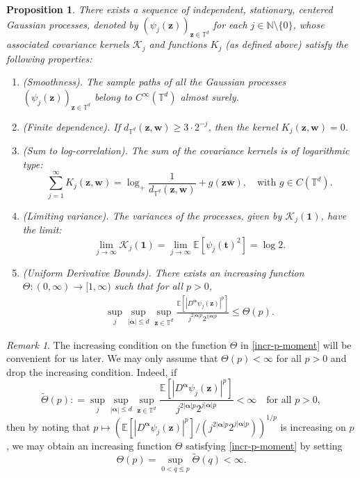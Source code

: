 \documentclass[12pt]{amsart}
\newtheorem{proposition}[theorem]{Proposition}
\theoremstyle{definition}
\theoremstyle{remark}
\newtheorem*{remark*}{Remark}
\newcommand{\bt}{\boldsymbol{t}}
\newcommand{\bz}{\boldsymbol{z}}
\newcommand{\bw}{\boldsymbol{w}}
\newcommand{\N}{\mathbb{N}}
\newcommand{\E}{\mathbb{E}}
\newcommand{\T}{\mathbb{T}}
\numberwithin{equation}{section}
\begin{document}
\begin{proposition}\label{prop:smooth-decomposition-log-correlated-field}
There exists a sequence of independent, stationary, centered Gaussian processes, denoted by $(\psi_j(\bz))_{\bz \in \T^d}$ for each $j\in \N\setminus\{0\}$, whose associated covariance kernels $\mathcal{K}_j$ and functions $K_j$ (as defined above) satisfy the following properties:
\begin{enumerate}
    \item[(P0)] (Smoothness). The sample paths of all the Gaussian processes $(\psi_j(\bz))_{\bz\in \T^d}$ belong to $C^\infty(\T^d)$ almost surely.

    \item[(P1)] (Finite dependence). If $d_{\T^d}(\bz, \bw) \ge 3 \cdot 2^{-j}$, then the kernel $K_j(\bz, \bw) = 0$.
    
    \item[(P2)] (Sum to log-correlation). The sum of the covariance kernels is of logarithmic type:
    \[
    \sum_{j=1}^{\infty} K_j(\bz, \bw) = \log_+ \frac{1}{d_{\T^d}(\bz, \bw)} + g(\bz\bar{\bw}),    \quad \text{with $g \in C(\T^d)$.}
    \]

    
    
    \item[(P3)] (Limiting variance).  The variances of the processes, given by $\mathcal{K}_j(\mathbf{1})$, have the limit:
    \[
    \lim_{j \to \infty} \mathcal{K}_j(\boldsymbol{1}) =\lim\limits_{j\to \infty}\mathbb{E}[\psi_j(\bt)^2]=\log 2.
    \]
    
    \item[(P4)] (Uniform Derivative Bounds). There exists an increasing function $\Theta: (0, \infty) \to [1, \infty)$ such that for all $p > 0$,
    \begin{align}\label{incr-p-moment}
        \sup_{j} \sup_{|\boldsymbol{\alpha}| \le d} \sup_{\bz\in \T^d} \frac{\E[|D^{\boldsymbol{\alpha}}\psi_j(\bz)|^p]}{j^{2|\boldsymbol{\alpha}|p}2^{j|\boldsymbol{\alpha}|p}} \le \Theta(p).
    \end{align}
\end{enumerate}
\end{proposition}

\begin{remark*}
The increasing condition on  the function $\Theta$ in \eqref{incr-p-moment} will be convenient for us later.   We may only assume that $\Theta(p)<\infty$ for all $p>0$  and drop the increasing  condition.  Indeed, if 
\[
\widetilde{\Theta}(p): = \sup_{j} \sup_{|\boldsymbol{\alpha}| \le d} \sup_{\bz\in \T^d} \frac{\E[|D^{\boldsymbol{\alpha}}\psi_j(\bz)|^p]}{j^{2|\boldsymbol{\alpha}|p}2^{j|\boldsymbol{\alpha}|p}} <\infty \quad \text{for all $p>0$},
\]
then by noting that 
$
p\mapsto (\E[|D^{\boldsymbol{\alpha}}\psi_j(\bz)|^p]/ (j^{2|\boldsymbol{\alpha}|p}2^{j|\boldsymbol{\alpha}|p}))^{1/p}
$ is increasing on $p$,  we may obtain an increasing function $\Theta$ satisfying \eqref{incr-p-moment} by setting 
\[
\Theta(p)=  \sup_{0<q\le p} \widetilde{\Theta}(q)<\infty. 
\]
\end{remark*}
\end{document}
